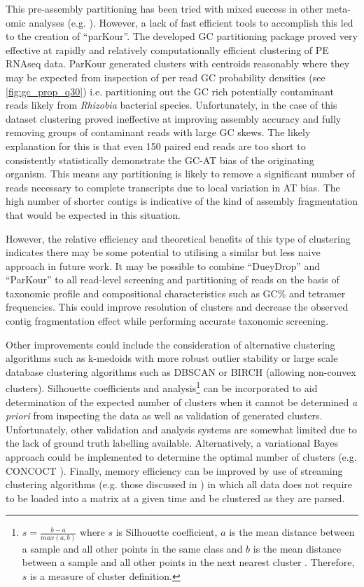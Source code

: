 This pre-assembly partitioning has been tried with mixed success in other meta-omic analyses (e.g. \citet{Droge2012}).
However, a lack of fast efficient tools to accomplish this led to the creation of ``parKour''.
The developed GC partitioning package proved very effective at rapidly and relatively computationally 
efficient clustering of PE RNAseq data. ParKour generated clusters with centroids
reasonably where they may be expected from inspection of per read GC probability densities (see \cref{fig:gc_prop_q30})
i.e. partitioning out the GC rich potentially contaminant reads likely from \textit{Rhizobia}
bacterial species.  Unfortunately, in the case of this dataset clustering proved ineffective
at improving assembly accuracy and fully removing groups of contaminant reads with large GC skews. 
The likely explanation for this is that even \SI{150}{\bp} paired end reads are too short to consistently
statistically demonstrate the GC-AT bias of the originating organism. This means any partitioning
is likely to remove a significant number of reads necessary to complete transcripts due to local
variation in AT bias.  The high number of shorter contigs is indicative of the kind of assembly
fragmentation that would be expected in this situation.

However, the relative efficiency and theoretical benefits of this type of clustering indicates there may be
some potential to utilising a similar but less naive approach in future work.
It may be possible to combine ``DueyDrop'' and ``ParKour'' to all
read-level screening and partitioning of reads on the basis of taxonomic profile
and compositional characteristics such as GC\% and tetramer frequencies.
This could improve resolution of clusters and decrease the observed contig fragmentation
effect while performing accurate taxonomic screening. 

Other improvements could include the consideration of alternative clustering algorithms 
such as k-medoids \citep{Kaufman1987} with more robust outlier stability or large scale
database clustering algorithms such as DBSCAN \citep{Ester1996} or BIRCH \citep{Zhang1996} (allowing non-convex
clusters). Silhouette coefficients and analysis\footnote{
    \(s = \frac{b -a}{max(a,b)}\) where \(s\) is Silhouette coefficient, \(a\) is the mean distance
	between a sample and all other points in the same class and \(b\) is the mean distance
	between a sample and all other points in the next nearest cluster \citep{scikit-learn}.  Therefore,
	\(s\) is a measure of cluster definition.}
\citep{Rousseeuw1987} can be incorporated to aid determination of the expected number of clusters when it cannot be determined
\textit{a priori} from inspecting the data as well as validation of generated clusters.  
Unfortunately, other validation and analysis systems are somewhat limited due to the lack of ground truth labelling 
available.  
Alternatively,
a variational Bayes approach could be implemented to determine the optimal number of clusters (e.g. CONCOCT \citep{Alneberg2014}).
Finally, memory efficiency can be improved by use of streaming clustering algorithms (e.g. those discussed in
\citet{OCallaghan2002})
in which all data does not require to be loaded into a matrix at a given time and be clustered
as they are parsed.  

